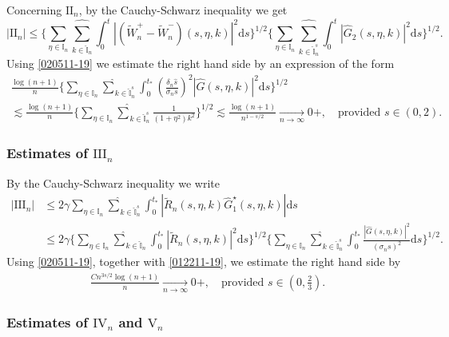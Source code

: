 \documentclass[EJP]{ejpecp} %
\newcommand\T{{\mathbb I}}
\newcommand \si{\sigma}
\renewcommand{\le}{\leqslant}
\newcommand{\dd  }{\mathrm{d}}
\renewcommand{\hat}{\widehat}
\renewcommand{\tilde}{\widetilde}
\numberwithin{equation}{section}
\begin{document}
Concerning $\mathrm{II}_n$,
by the Cauchy-Schwarz inequality we get
\begin{equation*}
|\mathrm{II}_n|\le \bigg\{\sum_{\eta\in\T_n}\underset{{k\in \widehat{\T}_n}}{{\hat\sum}}\int_0^t\left|\left(\tilde W_n^+-\tilde
  W_n^-\right)(s,\eta,k) \right|^2\dd s\bigg\}^{1/2} 
\bigg\{\sum_{\eta\in\T_n}\underset{{k\in \widehat{\T}_n^s}}{{\hat\sum}}\int_0^t |\hat G_2(s,\eta,k)|^2\dd s\bigg\}^{1/2} .
\end{equation*}
Using \eqref{020511-19} we  estimate the right hand side by an
expression of the form
\begin{multline*}
 \frac{\log (n+1)}{n}
\bigg\{\sum_{\eta\in\T_n}\underset{{k\in \widehat{\T}_n^s}}{{\hat\sum}}\int_0^{t_*} \left(\frac{\delta_n \hat s}{\sigma_n s}\right)^2|\hat G(s,\eta,k)|^2\dd s\bigg\}^{1/2} \\
\lesssim \frac{\log (n+1)}{n}
\bigg\{\sum_{\eta\in\T_n}\underset{{k\in \widehat{\T}_n^s}}{{\hat\sum}}\frac{1}{(1+\eta^2)k^2}\bigg\}^{1/2} \lesssim \frac{\log (n+1)}{n^{1-s/2}}\xrightarrow[n\to\infty]{} 0+, \quad \text{provided }s\in(0,2).
\end{multline*}

\subsubsection*{Estimates of $\mathrm{III}_n$}


By the Cauchy-Schwarz inequality we  write
\begin{align*}
|\mathrm{III}_n|&\le 2\gamma\sum_{\eta\in\T_n}\underset{{k\in \widehat{\T}_n^s}}{{\hat\sum}}\int_0^{t_*} \left|
\tilde R_n (s,\eta,k) \hat
  G^\star_1(s,\eta,k)\right|\dd s\\
&
\le  2\gamma\bigg\{\sum_{\eta\in\T_n}\underset{{k\in \widehat{\T}_n}}{{\hat\sum}}\int_0^{t_*} \left|
\tilde R_n (s,\eta,k)\right|^2\dd s\bigg\}^{1/2}\bigg\{\sum_{\eta\in\T_n}\underset{{k\in \widehat{\T}_n^s}}{{\hat\sum}}\int_0^{t_*} \frac{\left|
\hat
  G(s,\eta,k)\right|^2}{(\si_n s)^2}\dd s\bigg\}^{1/2}.
\end{align*}
Using \eqref{020511-19}, together with \eqref{012211-19}, we  estimate
the right hand side by
\begin{align*}
  \frac{Cn^{3s/2}\log (n+1)}{n}\xrightarrow[n\to\infty]{} 0+, \quad \text{provided }s\in(0,\tfrac23).
\end{align*}


\subsubsection*{Estimates of $\mathrm{IV}_{n}$ and $\mathrm{V}_n$}
\end{document}
